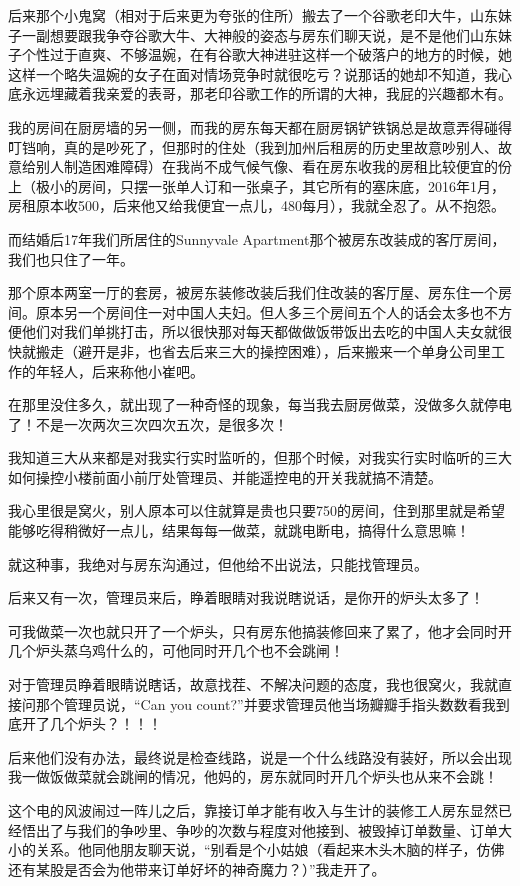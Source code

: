 \documentclass[9pt, b5paper]{article}
\begin{document}
后来那个小鬼窝（相对于后来更为夸张的住所）搬去了一个谷歌老印大牛，山东妹子一副想要跟我争夺谷歌大牛、大神般的姿态与房东们聊天说，是不是他们山东妹子个性过于直爽、不够温婉，在有谷歌大神进驻这样一个破落户的地方的时候，她这样一个略失温婉的女子在面对情场竞争时就很吃亏？说那话的她却不知道，我心底永远埋藏着我亲爱的表哥，那老印谷歌工作的所谓的大神，我屁的兴趣都木有。

我的房间在厨房墙的另一侧，而我的房东每天都在厨房锅铲铁锅总是故意弄得碰得叮铛响，真的是吵死了，但那时的住处（我到加州后租房的历史里故意吵别人、故意给别人制造困难障碍）在我尚不成气候气像、看在房东收我的房租比较便宜的份上（极小的房间，只摆一张单人订和一张桌子，其它所有的塞床底，2016年1月，房租原本收500，后来他又给我便宜一点儿，480每月），我就全忍了。从不抱怨。

而结婚后17年我们所居住的Sunnyvale Apartment那个被房东改装成的客厅房间，我们也只住了一年。

那个原本两室一厅的套房，被房东装修改装后我们住改装的客厅屋、房东住一个房间。原本另一个房间住一对中国人夫妇。但人多三个房间五个人的话会太多也不方便他们对我们单挑打击，所以很快那对每天都做做饭带饭出去吃的中国人夫女就很快就搬走（避开是非，也省去后来三大的操控困难），后来搬来一个单身公司里工作的年轻人，后来称他小崔吧。 

在那里没住多久，就出现了一种奇怪的现象，每当我去厨房做菜，没做多久就停电了！不是一次两次三次四次五次，是很多次！

我知道三大从来都是对我实行实时监听的，但那个时候，对我实行实时临听的三大如何操控小楼前面小前厅处管理员、并能遥控电的开关我就搞不清楚。

我心里很是窝火，别人原本可以住就算是贵也只要750的房间，住到那里就是希望能够吃得稍微好一点儿，结果每每一做菜，就跳电断电，搞得什么意思嘛！

就这种事，我绝对与房东沟通过，但他给不出说法，只能找管理员。

后来又有一次，管理员来后，睁着眼睛对我说瞎说话，是你开的炉头太多了！

可我做菜一次也就只开了一个炉头，只有房东他搞装修回来了累了，他才会同时开几个炉头蒸乌鸡什么的，可他同时开几个也不会跳闸！

对于管理员睁着眼睛说瞎话，故意找茬、不解决问题的态度，我也很窝火，我就直接问那个管理员说，“Can you count?”并要求管理员他当场瓣瓣手指头数数看我到底开了几个炉头？！！！

后来他们没有办法，最终说是检查线路，说是一个什么线路没有装好，所以会出现我一做饭做菜就会跳闸的情况，他妈的，房东就同时开几个炉头也从来不会跳！

这个电的风波闹过一阵儿之后，靠接订单才能有收入与生计的装修工人房东显然已经悟出了与我们的争吵里、争吵的次数与程度对他接到、被毁掉订单数量、订单大小的关系。他同他朋友聊天说，“别看是个小姑娘（看起来木头木脑的样子，仿佛还有某股是否会为他带来订单好坏的神奇魔力？）”我走开了。
\end{document}
